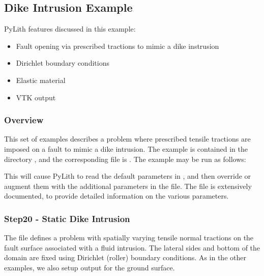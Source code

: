 \subsection{Dike Intrusion Example}
\label{sec:example:3dhex8:dike}

PyLith features discussed in this example:
\begin{itemize}
\item Fault opening via prescribed tractions to mimic a dike instrusion
\item Dirichlet boundary conditions
\item Elastic material
\item VTK output
\end{itemize}

\subsubsection{Overview}

This set of examples describes a problem where prescribed tensile
tractions are imposed on a fault to mimic a dike intrusion. The example
is contained in the directory , and the corresponding
 file is . The example may be run
as follows:
This will cause PyLith to read the default parameters in ,
and then override or augment them with the additional parameters in
the  file. The  file is extensively
documented, to provide detailed information on the various parameters.


\subsubsection{Step20 - Static Dike Intrusion}

The  file defines a problem with spatially varying
tensile normal tractions on the fault surface associated with a fluid
intrusion. The lateral sides and bottom of the domain are fixed using
Dirichlet (roller) boundary conditions. As in the other examples,
we also setup output for the ground surface.

